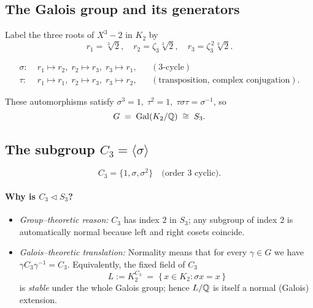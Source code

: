 \documentclass[12pt]{article}
\theoremstyle{definition} %
\theoremstyle{plain} %
\begin{document}
\subsection*{The Galois group and its generators}

Label the three roots of $X^{3}-2$ in $K_2$ by
\[
   r_1=\sqrt[3]{2},\quad
   r_2=\zeta_3\sqrt[3]{2},\quad
   r_3=\zeta_3^{\,2}\sqrt[3]{2}.
\]

\begin{align*}
   \sigma :\;
      &r_1\mapsto r_2,\;
        r_2\mapsto r_3,\;
        r_3\mapsto r_1,
      &&
      (\text{$3$-cycle}) \\[4pt]
   \tau :\;
      &r_1\mapsto r_1,\;
        r_2\mapsto r_3,\;
        r_3\mapsto r_2,
      &&
      (\text{transposition, complex conjugation}).
\end{align*}

These automorphisms satisfy  
$\sigma^{3}=1,\;\tau^{2}=1,\;\tau\sigma\tau=\sigma^{-1}$,  
so
\[
   G\;=\;\operatorname{Gal}(K_2/\Bbb Q)
   \;\cong\;S_3.
\]

\subsection*{The subgroup $C_3=\langle\sigma\rangle$}

\[
   C_3=\{1,\sigma,\sigma^{2}\}
   \quad\text{(order $3$ cyclic)}.
\]

\paragraph{Why is $C_3\lhd S_3$?}

\begin{itemize}
   \item \emph{Group–theoretic reason:}  
         $C_3$ has index $2$ in $S_3$; any subgroup of index $2$ is
         automatically normal because left and right cosets coincide.
   \item \emph{Galois–theoretic translation:}  
         Normality means that for every $\gamma\in G$
         we have $\gamma C_3\gamma^{-1}=C_3$.  
         Equivalently, the fixed field of $C_3$
         \[
             L := K_2^{C_3}
                \;=\;
                \{\,x\in K_2 : \sigma x = x\,\}
         \]
         is \emph{stable} under the whole Galois group; hence $L/\Bbb Q$
         is itself a normal (Galois) extension.
\end{itemize}
\end{document}
